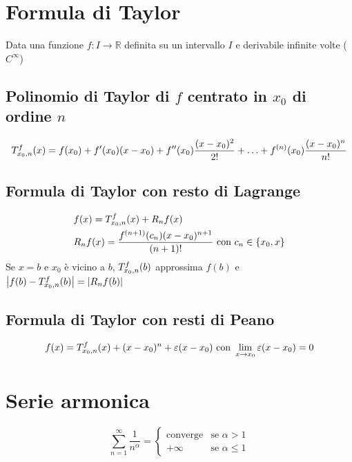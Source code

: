 \documentclass[12pt, a4paper]{article}
\begin{document}
\section{Formula di Taylor}
    Data una funzione $f:I\rightarrow\mathbb{R}$ definita su un intervallo $I$ e derivabile infinite volte ($C^{\infty}$)
    \subsection{Polinomio di Taylor di $f$ centrato in $x_0$ di ordine $n$}
        \begin{equation*}
            \taylor{f}{x_0}{n}(x) = f(x_0)+f'(x_0)(x-x_0)+f''(x_0)\frac{(x-x_0)^2}{2!}+\ldots+f^{(n)}(x_0)\frac{(x-x_0)^n}{n!}
        \end{equation*}
    \subsection{Formula di Taylor con resto di Lagrange}
        \begin{equation*}
            \begin{split}
                &f(x) = \taylor{f}{x_0}{n}(x) + R_nf(x)\\
                &R_nf(x) = \frac{f^{(n+1)}(c_n)(x-x_0)^{n+1}}{(n+1)!} \text{ con } c_n\in\{x_0,x\}
            \end{split}
        \end{equation*}
        Se $x=b$ e $x_0$ è vicino a $b$, $\taylor{f}{x_0}{n}(b)$ approssima $f(b)$ e $\left|f(b)-\taylor{f}{x_0}{n}(b)\right| = \left|R_nf(b)\right|$
    \subsection{Formula di Taylor con resti di Peano}
        \begin{equation*}
                f(x)= \taylor{f}{x_0}{n}(x) + (x-x_0)^n + \varepsilon(x-x_0) \text{ con } \lim_{x\rightarrow x_0} \varepsilon(x-x_0) = 0
        \end{equation*}
\section{Serie armonica}
    \begin{equation*}
        \sum_{n=1}^{\infty}\frac{1}{n^\alpha} = \begin{cases}
            \text{converge} & \text{se }\alpha > 1\\
            +\infty & \text{se }\alpha\leq 1
        \end{cases}
    \end{equation*}
\end{document}
